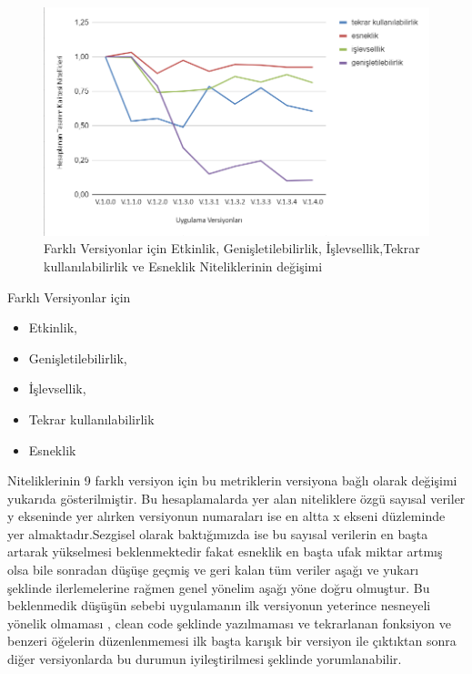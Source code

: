 \documentclass[conference]{IEEEtran}
\begin{document}
\begin{figure}[h]
	\centering
\includegraphics[scale=0.515]{grafik1.png}
	\caption{Farklı Versiyonlar için Etkinlik, Genişletilebilirlik, İşlevsellik,Tekrar kullanılabilirlik ve Esneklik Niteliklerinin değişimi}
	\label{Grafik1}
\end{figure}


Farklı Versiyonlar için 
  
\begin{itemize}
\item   Etkinlik, 
\item    Genişletilebilirlik, 
\item    İşlevsellik,
\item    Tekrar kullanılabilirlik 
\item    Esneklik 
\end{itemize}

Niteliklerinin  9 farklı versiyon için  bu metriklerin versiyona bağlı olarak değişimi yukarıda gösterilmiştir. Bu hesaplamalarda yer alan niteliklere özgü sayısal veriler y ekseninde yer alırken versiyonun numaraları ise en altta x ekseni düzleminde yer almaktadır.Sezgisel olarak baktığımızda ise bu  sayısal verilerin en başta artarak yükselmesi beklenmektedir fakat esneklik en başta ufak miktar artmış olsa bile sonradan düşüşe geçmiş ve geri kalan tüm veriler aşağı  ve yukarı şeklinde ilerlemelerine rağmen genel yönelim aşağı yöne doğru olmuştur. Bu  beklenmedik düşüşün sebebi uygulamanın ilk versiyonun yeterince nesneyeli yönelik olmaması , clean code şeklinde yazılmaması ve tekrarlanan fonksiyon ve benzeri öğelerin düzenlenmemesi ilk başta karışık bir versiyon ile çıktıktan sonra diğer versiyonlarda bu durumun iyileştirilmesi şeklinde yorumlanabilir.
\end{document}
